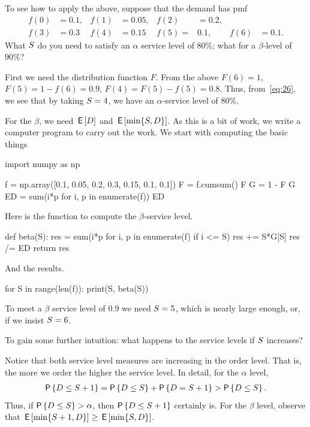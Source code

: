 \begin{exercise}
To see how to apply the above, suppose that the demand has pmf
\begin{align*}
 f(0)&=0.1, &f(1)&=0.05, &f(2)&=0.2, \\
f(3) &= 0.3 & f(4) &= 0.15 & f(5)=& 0.1, &f(6)&=0.1.
\end{align*}
What $S$ do you need to satisfy an $\alpha$ service level of 80\%; what for a $\beta$-level of $90\%$?
\begin{solution}
First we need the distribution function $F$. From the above
$F(6)=1$, $F(5)=1-f(6) = 0.9$, $F(4)=F(5)-f(5) = 0.8$. Thus, from~\eqref{eq:26}, we see that by taking $S=4$, we have an $\alpha$-service level of 80\%.

For the $\beta$, we need $\,\mathsf{E}\left[D\right]$ and $\,\mathsf{E}\left[\min\{S, D\}\right]$. As this is a bit of work, we write a computer program to carry out the work. We start with computing the basic things
\begin{pyconsole} 
import numpy as np

f = np.array([0.1, 0.05, 0.2, 0.3, 0.15, 0.1, 0.1])
F = f.cumsum()
F
G = 1 - F
G
ED = sum(i*p for i, p in enumerate(f))
ED
\end{pyconsole}

Here is the function to compute the $\beta$-service level.
\begin{pyconsole}
def beta(S):
    res = sum(i*p for i, p in enumerate(f) if i <= S)
    res += S*G[S]
    res /= ED
    return res
    
\end{pyconsole}
And the results.
\begin{pyconsole}
for S in range(len(f)):
    print(S, beta(S))
    
\end{pyconsole}
To meet a $\beta$ service level of $0.9$ we need  $S=5$, which is nearly large enough, or, if we insist $S=6$. 
\end{solution}
\end{exercise}

\begin{exercise}
To gain some further intuition:  what happens to the service levels if $S$ increases?
  \begin{solution}
Notice that both service level measures are increasing in the order level. That is, the more we order the higher the service level. In detail, for the $\alpha$ level,
\begin{align*}
  \P{D\leq \Q+1} = \P{D\leq \Q} + \P{D=\Q+1} > \P{D \leq \Q}.
\end{align*}
Thus, if $\P{D\leq \Q} > \alpha$, then $\P{D\leq \Q+1}$ certainly is. For the $\beta$ level, observe that $\,\mathsf{E}\left[\min\{S+1, D\}\right] \geq \,\mathsf{E}\left[\min\{S, D\}\right]$. 
  \end{solution}
\end{exercise}

